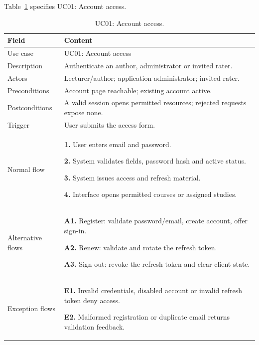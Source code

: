 \needspace{.39\textheight}
Table~\ref{tab:uc-01} specifies UC01: Account access.
\begin{table}[H]\centering\footnotesize{}\renewcommand{\arraystretch}{1.05}
\caption{UC01: Account access.}\label{tab:uc-01}
\begin{tabular}{|p{2.8cm}|p{11.9cm}|}\hline
\textbf{Field} & \textbf{Content}\\\hline
Use case & UC01: Account access\\\hline
Description & Authenticate an author, administrator or invited rater.\\\hline
Actors & Lecturer/author; application administrator; invited rater.\\\hline
Preconditions & Account page reachable; existing account active.\\\hline
Postconditions & A valid session opens permitted resources; rejected requests expose none.\\\hline
Trigger & User submits the access form.\\\hline
Normal flow & \textbf{1.} User enters email and password.\par \textbf{2.} System validates fields, password hash and active status.\par \textbf{3.} System issues access and refresh material.\par \textbf{4.} Interface opens permitted courses or assigned studies.\\\hline
Alternative flows & \textbf{A1.} Register: validate password/email, create account, offer sign-in.\par \textbf{A2.} Renew: validate and rotate the refresh token.\par \textbf{A3.} Sign out: revoke the refresh token and clear client state.\\\hline
Exception flows & \textbf{E1.} Invalid credentials, disabled account or invalid refresh token deny access.\par \textbf{E2.} Malformed registration or duplicate email returns validation feedback.\\\hline
\end{tabular}\end{table}

